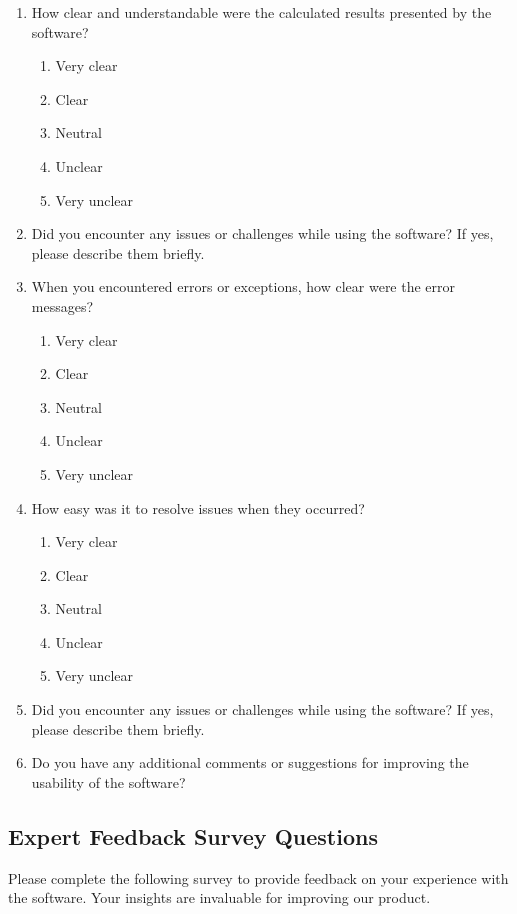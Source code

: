 \documentclass[12pt, titlepage]{article}
\begin{document}
\begin{enumerate}
    \item How clear and understandable were the calculated results presented by the software?
    \begin{enumerate}
        \item Very clear
        \item Clear
        \item Neutral
        \item Unclear
        \item Very unclear
    \end{enumerate}
    \item Did you encounter any issues or challenges while using the software? If yes, please describe them briefly.
    \item When you encountered errors or exceptions, how clear were the error messages?
        \begin{enumerate}
        \item Very clear
        \item Clear
        \item Neutral
        \item Unclear
        \item Very unclear
    \end{enumerate}
    \item How easy was it to resolve issues when they occurred?
        \begin{enumerate}
        \item Very clear
        \item Clear
        \item Neutral
        \item Unclear
        \item Very unclear
    \end{enumerate}
    \item Did you encounter any issues or challenges while using the software? If yes, please describe them briefly.
    \item Do you have any additional comments or suggestions for improving the usability of the software?

\end{enumerate}

\subsection{Expert Feedback Survey Questions}\label{subsec:ExpertUsabilitySurvery}

Please complete the following survey to provide feedback on your experience with the software. Your insights are invaluable for improving our product.
\end{document}
